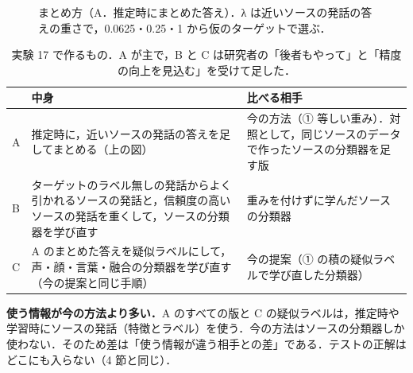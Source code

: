 \documentclass[a4paper,11pt]{ltjsarticle}
\begin{document}
\begin{figure}[H]
\centering
{}
\caption{まとめ方（A．推定時にまとめた答え）．λ は近いソースの発話の答えの重さで，0.0625・0.25・1 から仮のターゲットで選ぶ．}
\end{figure}

\begin{table}[H]
\centering
\small
\caption{実験 17 で作るもの．A が主で，B と C は研究者の「後者もやって」と「精度の向上を見込む」を受けて足した．}
\begin{tabular}{>{\raggedright}p{1.0cm}>{\raggedright}p{8.0cm}p{6.2cm}}
\toprule
 & 中身 & 比べる相手 \\
\midrule
A & 推定時に，近いソースの発話の答えを足してまとめる（上の図） & 今の方法（① 等しい重み）．対照として，同じソースのデータで作ったソースの分類器を足す版 \\
B & ターゲットのラベル無しの発話からよく引かれるソースの発話と，信頼度の高いソースの発話を重くして，ソースの分類器を学び直す & 重みを付けずに学んだソースの分類器 \\
C & A のまとめた答えを疑似ラベルにして，声・顔・言葉・融合の分類器を学び直す（今の提案と同じ手順） & 今の提案（① の積の疑似ラベルで学び直した分類器） \\
\bottomrule
\end{tabular}
\end{table}

\begin{chui}
\textbf{使う情報が今の方法より多い．}A のすべての版と C の疑似ラベルは，推定時や学習時にソースの発話（特徴とラベル）を使う．今の方法はソースの分類器しか使わない．そのため差は「使う情報が違う相手との差」である．テストの正解はどこにも入らない（4 節と同じ）．
\end{chui}
\end{document}
